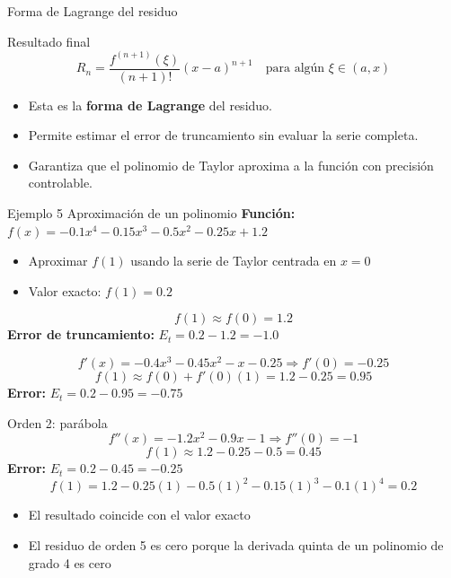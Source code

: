 \documentclass[main.tex]{subfiles}
\begin{document}
\begin{frame}{Forma de Lagrange del residuo}
\small
\begin{block}{Resultado final}
\[
\boxed{
R_n = \frac{f^{(n+1)}(\xi)}{(n+1)!}(x-a)^{n+1}
}
\quad\text{para algún } \xi\in(a,x)
\]
\end{block}

\begin{itemize}
  \item Esta es la \textbf{forma de Lagrange} del residuo.
  \item Permite estimar el error de truncamiento sin evaluar la serie completa.
  \item Garantiza que el polinomio de Taylor aproxima a la función con precisión controlable.
\end{itemize}
\end{frame}



\begin{frame}{Ejemplo 5 Aproximación de un polinomio}
\textbf{Función:} \(f(x) = -0.1x^4 - 0.15x^3 - 0.5x^2 - 0.25x + 1.2\)
\begin{itemize}
  \item Aproximar \(f(1)\) usando la serie de Taylor centrada en \(x = 0\)
  \item Valor exacto: \(f(1) = 0.2\)
\end{itemize}

\[
  f(1) \approx f(0) = 1.2
\]
\textbf{Error de truncamiento:} \(E_t = 0.2 - 1.2 = -1.0\)


\[
  f'(x) = -0.4x^3 - 0.45x^2 - x - 0.25 \Rightarrow f'(0) = -0.25
\]
\[
  f(1) \approx f(0) + f'(0)(1) = 1.2 - 0.25 = 0.95
\]
\textbf{Error:} \(E_t = 0.2 - 0.95 = -0.75\)
\end{frame}

\begin{frame}{Orden 2: parábola}
\[
  f''(x) = -1.2x^2 - 0.9x - 1 \Rightarrow f''(0) = -1
\]
\[
  f(1) \approx 1.2 - 0.25 - 0.5 = 0.45
\]
\textbf{Error:} \(E_t = 0.2 - 0.45 = -0.25\)
\[
  f(1) = 1.2 - 0.25(1) - 0.5(1)^2 - 0.15(1)^3 - 0.1(1)^4 = 0.2
\]
\begin{itemize}
  \item El resultado coincide con el valor exacto
  \item El residuo de orden 5 es cero porque la derivada quinta de un polinomio de grado 4 es cero
\end{itemize}
\end{frame}
\end{document}

